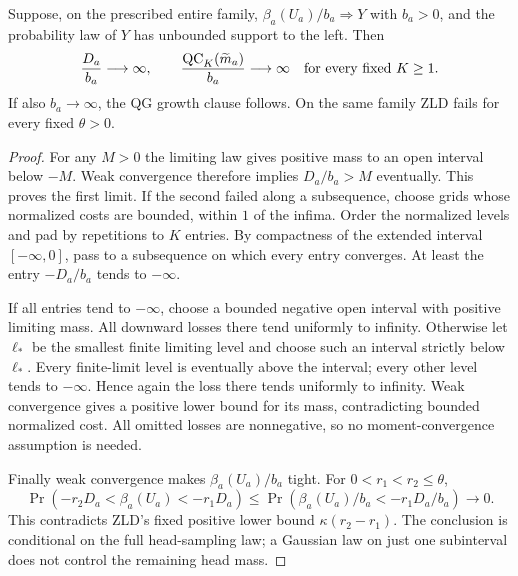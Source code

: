 \begin{proposition}
\label{ns54-selberg-prop-unbounded}
Suppose, on the prescribed entire family,
$\beta_a(U_a)/b_a\Rightarrow Y$ with $b_a>0$, and the probability
law of $Y$ has unbounded support to the left. Then
\begin{equation}\label{ns54-selberg-eq-unbounded}
 \frac{D_a}{b_a}\longrightarrow\infty,\qquad
 \frac{\mathrm{QC}_K(\widetilde m_a)}{b_a}\longrightarrow\infty
                   \quad\hbox{for every fixed }K\ge1.
\end{equation}
If also $b_a\to\infty$, the QG growth clause follows. On the same
family ZLD fails for every fixed $\theta>0$.
\end{proposition}
\begin{proof}
For any $M>0$ the limiting law gives positive mass to an open
interval below $-M$. Weak convergence therefore implies
$D_a/b_a>M$ eventually. This proves the first limit.
If the second failed along a subsequence, choose grids whose
normalized costs are bounded, within $1$ of the infima.
Order the normalized levels and pad by repetitions to $K$ entries.
By compactness of the extended interval $[-\infty,0]$, pass to a
subsequence on which every entry converges. At least the entry
$-D_a/b_a$ tends to $-\infty$.

If all entries tend to $-\infty$, choose a bounded negative open
interval with positive limiting mass. All downward losses there
tend uniformly to infinity. Otherwise let $\ell_*$ be the smallest
finite limiting level and choose such an interval strictly below
$\ell_*$. Every finite-limit level is eventually above the interval;
every other level tends to $-\infty$. Hence again the loss there
tends uniformly to infinity. Weak convergence gives a positive
lower bound for its mass, contradicting bounded normalized cost.
All omitted losses are nonnegative, so no moment-convergence
assumption is needed.

Finally weak convergence makes $\beta_a(U_a)/b_a$ tight. For
$0<r_1<r_2\le\theta$,
\[
 \Pr(-r_2D_a<\beta_a(U_a)<-r_1D_a)
 \le\Pr(\beta_a(U_a)/b_a<-r_1D_a/b_a)\longrightarrow0.
\]
This contradicts ZLD's fixed positive lower bound
$\kappa(r_2-r_1)$. The conclusion is conditional on the full
head-sampling law; a Gaussian law on just one subinterval does
not control the remaining head mass.
\end{proof}

